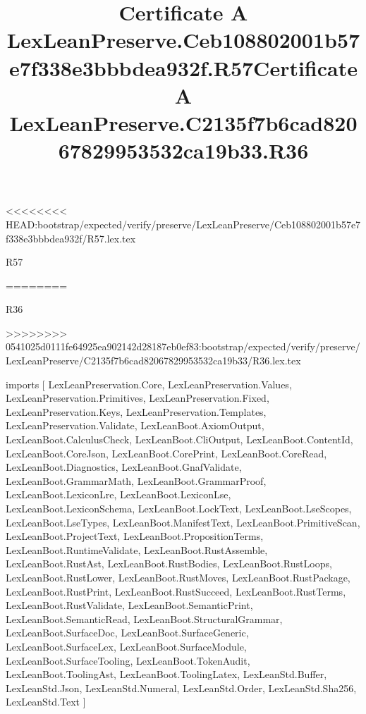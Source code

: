 <<<<<<<< HEAD:bootstrap/expected/verify/preserve/LexLeanPreserve/Ceb108802001b57e7f338e3bbbdea932f/R57.lex.tex
\begin{lexlean}{R57}
\title{Certificate A LexLeanPreserve.Ceb108802001b57e7f338e3bbbdea932f.R57}
========
\begin{lexlean}{R36}
\title{Certificate A LexLeanPreserve.C2135f7b6cad82067829953532ca19b33.R36}
>>>>>>>> 0541025d0111fe64925ea902142d28187eb0ef83:bootstrap/expected/verify/preserve/LexLeanPreserve/C2135f7b6cad82067829953532ca19b33/R36.lex.tex
\begin{coremodule}
imports [
  LexLeanPreservation.Core,
  LexLeanPreservation.Values,
  LexLeanPreservation.Primitives,
  LexLeanPreservation.Fixed,
  LexLeanPreservation.Keys,
  LexLeanPreservation.Templates,
  LexLeanPreservation.Validate,
  LexLeanBoot.AxiomOutput,
  LexLeanBoot.CalculusCheck,
  LexLeanBoot.CliOutput,
  LexLeanBoot.ContentId,
  LexLeanBoot.CoreJson,
  LexLeanBoot.CorePrint,
  LexLeanBoot.CoreRead,
  LexLeanBoot.Diagnostics,
  LexLeanBoot.GnafValidate,
  LexLeanBoot.GrammarMath,
  LexLeanBoot.GrammarProof,
  LexLeanBoot.LexiconLre,
  LexLeanBoot.LexiconLse,
  LexLeanBoot.LexiconSchema,
  LexLeanBoot.LockText,
  LexLeanBoot.LseScopes,
  LexLeanBoot.LseTypes,
  LexLeanBoot.ManifestText,
  LexLeanBoot.PrimitiveScan,
  LexLeanBoot.ProjectText,
  LexLeanBoot.PropositionTerms,
  LexLeanBoot.RuntimeValidate,
  LexLeanBoot.RustAssemble,
  LexLeanBoot.RustAst,
  LexLeanBoot.RustBodies,
  LexLeanBoot.RustLoops,
  LexLeanBoot.RustLower,
  LexLeanBoot.RustMoves,
  LexLeanBoot.RustPackage,
  LexLeanBoot.RustPrint,
  LexLeanBoot.RustSucceed,
  LexLeanBoot.RustTerms,
  LexLeanBoot.RustValidate,
  LexLeanBoot.SemanticPrint,
  LexLeanBoot.SemanticRead,
  LexLeanBoot.StructuralGrammar,
  LexLeanBoot.SurfaceDoc,
  LexLeanBoot.SurfaceGeneric,
  LexLeanBoot.SurfaceLex,
  LexLeanBoot.SurfaceModule,
  LexLeanBoot.SurfaceTooling,
  LexLeanBoot.TokenAudit,
  LexLeanBoot.ToolingAst,
  LexLeanBoot.ToolingLatex,
  LexLeanStd.Buffer,
  LexLeanStd.Json,
  LexLeanStd.Numeral,
  LexLeanStd.Order,
  LexLeanStd.Sha256,
  LexLeanStd.Text
]


\end{coremodule}
\end{lexlean}
\end{lexlean}

